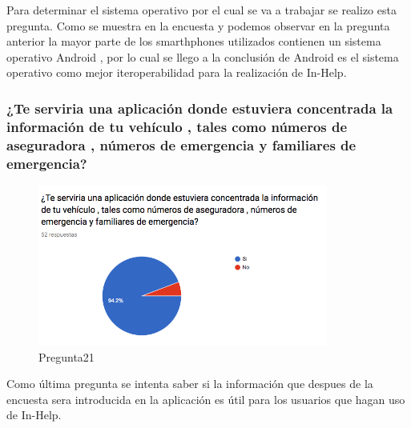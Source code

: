 Para determinar el sistema operativo por el cual se va a trabajar se realizo esta pregunta. Como se muestra en la encuesta y podemos observar en la pregunta anterior la mayor parte de los smarthphones utilizados contienen un sistema operativo Android , por lo cual se llego a la conclusión de Android es el sistema operativo como mejor iteroperabilidad para la realización de In-Help.\\

\subsubsection{¿Te serviria una aplicación donde estuviera concentrada la información de tu vehículo , tales como números de aseguradora , números de emergencia y familiares de emergencia?}

\begin{figure}[htbp!]
	\begin{center}
		\includegraphics[width=0.85\textwidth]{DisenoEstructura/imagenes/Pregunta21}
		\caption{Pregunta21}
		\label{DE/FO/Pregunta21}
	\end{center}
\end{figure}

Como última pregunta se intenta saber si la información que despues de la encuesta sera introducida en la aplicación es útil para los usuarios que hagan uso de In-Help.\\





